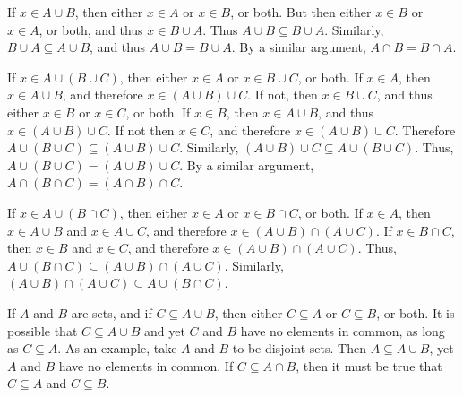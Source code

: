             \begin{bproof}
                If $x\in{A}\cup{B}$, then either $x\in{A}$ or $x\in{B}$,
                or both. But then either $x\in{B}$ or $x\in{A}$, or both,
                and thus $x\in{B}\cup{A}$. Thus $A\cup{B}\subseteq{B}\cup{A}$.
                Similarly, $B\cup{A}\subseteq{A}\cup{B}$, and thus
                $A\cup{B}=B\cup{A}$. By a similar argument,
                $A\cap{B}=B\cap{A}$.
                \par\hfill\par
                If $x\in{A}\cup(B\cup{C})$, then either
                $x\in{A}$ or $x\in{B}\cup{C}$, or both.
                If $x\in{A}$, then $x\in{A}\cup{B}$, and
                therefore $x\in(A\cup{B})\cup{C}$. If not,
                then $x\in{B}\cup{C}$, and thus either
                $x\in{B}$ or $x\in{C}$, or both.
                If $x\in{B}$, then $x\in{A}\cup{B}$, and
                thus $x\in(A\cup{B})\cup{C}$. If not
                then $x\in{C}$, and therefore
                $x\in(A\cup{B})\cup{C}$. Therefore
                $A\cup(B\cup{C})\subseteq(A\cup{B})\cup{C}$.
                Similarly, $(A\cup{B})\cup{C}\subseteq{A}\cup(B\cup{C})$.
                Thus, $A\cup(B\cup{C})=(A\cup{B})\cup{C}$. By a similar
                argument, $A\cap(B\cap{C})=(A\cap{B})\cap{C}$.
                \par\hfill\par
                If $x\in{A}\cup(B\cap{C})$, then either $x\in{A}$
                or $x\in{B}\cap{C}$, or both. If $x\in{A}$, then
                $x\in{A}\cup{B}$ and $x\in{A}\cup{C}$, and therefore
                $x\in(A\cup{B})\cap(A\cup{C})$. If $x\in{B}\cap{C}$,
                then $x\in{B}$ and $x\in{C}$, and therefore
                $x\in(A\cup{B})\cap(A\cup{C})$. Thus,
                $A\cup(B\cap{C})\subseteq(A\cup{B})\cap(A\cup{C})$.
                Similarly,
                $(A\cup{B})\cap(A\cup{C})\subseteq{A}\cup(B\cap{C})$.
            \end{bproof}
            If $A$ and $B$ are sets, and if $C\subseteq{A}\cup{B}$, then
            either $C\subseteq{A}$ or $C\subseteq{B}$, or both. It is
            possible that $C\subseteq{A}\cup{B}$ and yet $C$ and $B$ have no
            elements in common, as long as $C\subseteq{A}$. As an example,
            take $A$ and $B$ to be disjoint sets. Then $A\subseteq{A}\cup{B}$,
            yet $A$ and $B$ have no elements in common. If
            $C\subseteq{A}\cap{B}$, then it must be true that
            $C\subseteq{A}$ and $C\subseteq{B}$.
